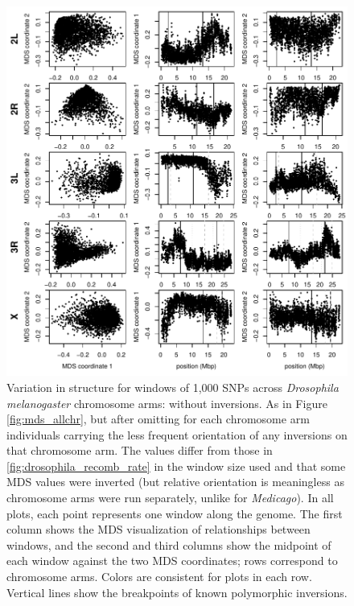 \documentclass[11pt, oneside]{article}   	%
\begin{document}
\begin{figure}
    \begin{center}
        \includegraphics{MDS_allchr_Together_plot_samples_noinv}
    \end{center}
    \caption{
        Variation in structure for windows of 1,000 SNPs 
        across \textit{Drosophila melanogaster} chromosome arms: without inversions.
         As in Figure \ref{fig:mds_allchr}, but after omitting for each chromosome arm individuals carrying the less frequent orientation
         of any inversions on that chromosome arm.
         The values differ from those in \ref{fig:drosophila_recomb_rate}
         in the window size used and that some MDS values were inverted
         (but relative orientation is meaningless as chromosome arms were run separately,
         unlike for \textit{Medicago}).
        In all plots, each point represents one window along the genome.
         The first column shows the MDS visualization of relationships between windows, 
         and the second and third columns show the midpoint of each window against the two MDS coordinates; 
         rows correspond to chromosome arms.
         Colors are consistent for plots in each row. 
         Vertical lines show the breakpoints of known polymorphic inversions.   
         \label{sfig:mds_allchr_noinversions}
    }
\end{figure}
\end{document}
